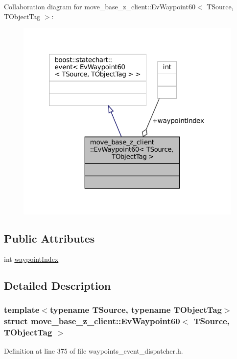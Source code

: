 Collaboration diagram for move\+\_\+base\+\_\+z\+\_\+client\+:\+:Ev\+Waypoint60$<$ T\+Source, T\+Object\+Tag $>$\+:
\nopagebreak
\begin{figure}[H]
\begin{center}
\leavevmode
\includegraphics[width=320pt]{structmove__base__z__client_1_1EvWaypoint60__coll__graph}
\end{center}
\end{figure}
\subsection*{Public Attributes}
\begin{DoxyCompactItemize}
\item 
int \hyperlink{structmove__base__z__client_1_1EvWaypoint60_a03c96271900b3f3a230a7d7df7b5315a}{waypoint\+Index}
\end{DoxyCompactItemize}


\subsection{Detailed Description}
\subsubsection*{template$<$typename T\+Source, typename T\+Object\+Tag$>$\newline
struct move\+\_\+base\+\_\+z\+\_\+client\+::\+Ev\+Waypoint60$<$ T\+Source, T\+Object\+Tag $>$}



Definition at line 375 of file waypoints\+\_\+event\+\_\+dispatcher.\+h.



